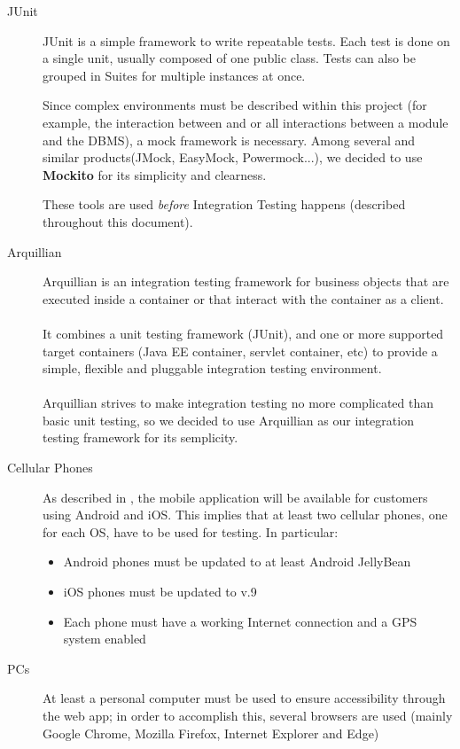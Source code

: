 \documentclass[a4paper, 12pt]{article}
\newcounter{tc}
\begin{document}
\begin{description}
    \item[JUnit] JUnit is a simple framework to write repeatable tests. Each test is done on a single unit, usually composed of one public class. Tests can also be grouped in Suites for multiple instances at once.

    Since complex environments must be described within this project (for example, the interaction between  and  or all interactions between a module and the DBMS), a mock framework is necessary. Among several and similar products(JMock, EasyMock, Powermock...), we decided to use \textbf{Mockito} for its simplicity and clearness.

    These tools are used \emph{before} Integration Testing happens (described throughout this document).

    \item[Arquillian] Arquillian is an integration testing framework for business objects that are executed inside a container or that interact with the container as a client. \\
\\
It combines a unit testing framework (JUnit), and one or more supported target containers (Java EE container, servlet container, etc) to provide a simple, flexible and pluggable integration testing environment. \\ \\
Arquillian strives to make integration testing no more complicated than basic unit testing, so we decided to use Arquillian as our integration testing framework for its semplicity.

    \item[Cellular Phones] As described in \cite{bib:rasd}, the mobile application will be available for customers using Android and iOS. This implies that at least two cellular phones, one for each OS, have to be used for testing. In particular:
    \begin{itemize}
        \item Android phones must be updated to at least Android JellyBean
        \item iOS phones must be updated to v.9
        \item Each phone must have a working Internet connection and a GPS system enabled
    \end{itemize}

    \item[PCs] At least a personal computer must be used to ensure accessibility through the web app; in order to accomplish this, several browsers are used (mainly Google Chrome, Mozilla Firefox, Internet Explorer and Edge)

\end{description}
\end{document}
